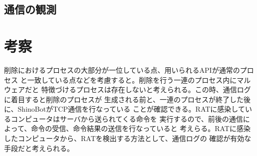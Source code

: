 \documentclass[dvipdfmx,autodetect-engine]{jsarticle}
\begin{document}
\subsection{通信の観測}

\begin{figure}[H]
  \centering
  \caption{}
\end{figure}

\section{考察}
削除におけるプロセスの大部分が一位している点、用いられるAPIが通常のプロセス
と一致している点などを考慮すると。削除を行う一連のプロセス内にマルウェアだと
特徴づけるプロセスは存在しないと考えられる。この時、通信ログに着目すると削除のプロセスが
生成される前と、一連のプロセスが終了した後に、ShinoBotがTCP通信を行なっている
ことが確認できる。RATに感染しているコンピュータはサーバから送られてくる命令を
実行するので、前後の通信によって、命令の受信、命令結果の送信を行なっていると
考えらる。RATに感染したコンピュータから、RATを検出する方法として、通信ログの
確認が有効な手段だと考えられる。
\end{document}
